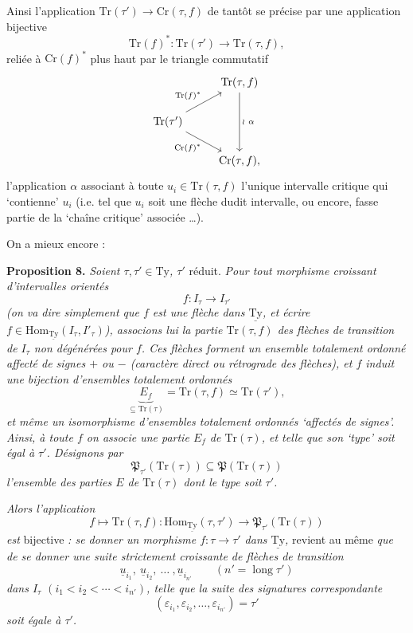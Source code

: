 \documentclass[11pt]{article}
\newcommand{\printedpage}[1]{\marginpar{\footnotesize p.~#1}}
\newcommand{\msp}[1]{\marginpar{\footnotesize [#1]}}
\newcommand{\Tr}{\mathrm{Tr}}
\newcommand{\Cr}{\mathrm{Cr}}
\newcommand{\Hom}{\mathrm{Hom}}
\newcommand{\lng}{\operatorname{long}}
\newcommand{\uTy}{\underline{\mathrm{Ty}}}
\begin{document}
Ainsi l'application $\Tr(\tau') \longrightarrow \Cr(\tau, f)$ de tantôt se précise par une application bijective
\[
\Tr(f)^* : \Tr(\tau') \longrightarrow \Tr(\tau, f),
\]
reliée à $\Cr(f)^*$ plus haut par le triangle commutatif
\[
\begin{tikzcd}
 & \Tr(\tau, f) \arrow[dd, "\wr\ \alpha"] \\
\Tr(\tau') \arrow[ur, "\Tr(f)^*"] \arrow[dr, "\Cr(f)^*"'] & \\
 & \Cr(\tau, f),
\end{tikzcd}
\]
\printedpage{25}
\msp{page 39}
l'application $\alpha$ associant à toute $u_i \in \Tr(\tau, f)$ l'unique intervalle critique qui ‘contienne’ $u_i$ (i.e. tel que $u_i$ soit une flèche dudit intervalle, ou encore, fasse partie de la ‘chaîne critique’ associée \dots).

On a mieux encore :

\textbf{Proposition 8.} \textit{Soient $\tau, \tau' \in \mathrm{Ty}$, $\tau'$} réduit. \textit{Pour tout morphisme croissant d'intervalles orientés}
\[
f : I_\tau \longrightarrow I_{\tau'}
\]
\textit{(on va dire simplement que $f$ est une flèche dans $\uTy$, et écrire $f \in \Hom_{\uTy}(I_\tau, I'_\tau)$), associons lui la partie $\Tr(\tau, f)$ des flèches de transition de $I_\tau$ non dégénérées pour $f$. Ces flèches forment un ensemble totalement ordonné affecté de signes $+$ ou $-$ (caractère direct ou rétrograde des flèches), et $f$ induit une bijection d'ensembles totalement ordonnés} %
\[
\underbrace{E_f}_{\subseteq \Tr(\tau)} = \Tr(\tau, f) \simeq \Tr(\tau'),
\]
\textit{et même un isomorphisme d'ensembles totalement ordonnés ‘affectés de signes’. Ainsi, à toute $f$ on associe une partie $E_f$ de $\Tr(\tau)$, et telle que son ‘type’ soit égal à $\tau'$. Désignons par}
\[
\mathfrak{P}_{\tau'}(\Tr(\tau)) \subseteq \mathfrak{P}(\Tr(\tau))
\]
\textit{l'ensemble des parties $E$ de $\Tr(\tau)$ dont le type soit $\tau'$.}

\msp{page 40}
\textit{Alors l'application}
\[
f \longmapsto \Tr(\tau, f) : \Hom_{\uTy}(\tau, \tau') \longrightarrow \mathfrak{P}_{\tau'}(\Tr(\tau))
\]
\textit{est} bijective \textit{: se donner un morphisme $f : \tau \longrightarrow \tau'$ dans $\uTy$,} revient au même \textit{que de se donner une suite strictement croissante de flèches de transition}
\[
\underline{u}_{i_1},\ \underline{u}_{i_2},\ \dots\ ,\underline{u}_{i_{n'}} \qquad (n' = \lng \tau')
\]
\textit{dans $I_\tau$ $(i_1 < i_2 < \cdots < i_{n'})$, telle que la suite des signatures correspondante}
\[
(\varepsilon_{i_1}, \varepsilon_{i_2}, \dots, \varepsilon_{i_{n'}}) = \tau'
\]
\textit{soit égale à $\tau'$.}
\end{document}
